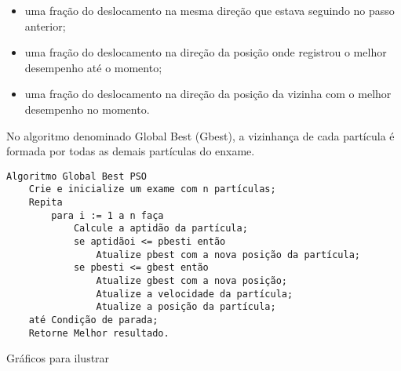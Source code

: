 \begin{itemize}
    \item uma fração do deslocamento na mesma direção que estava seguindo no passo anterior;
    \item uma fração do deslocamento na direção da posição onde registrou o melhor desempenho até o momento;
    \item uma fração do deslocamento na direção da posição da vizinha com o melhor desempenho no momento.
\end{itemize}

No algoritmo denominado Global Best (Gbest), a vizinhança de cada partícula é formada por todas as demais partículas do enxame.

\begin{verbatim}
Algoritmo Global Best PSO
    Crie e inicialize um exame com n partículas;
    Repita
        para i := 1 a n faça
            Calcule a aptidão da partícula;
            se aptidãoi <= pbesti então
                Atualize pbest com a nova posição da partícula;
            se pbesti <= gbest então
                Atualize gbest com a nova posição;
                Atualize a velocidade da partícula;
                Atualize a posição da partícula;
    até Condição de parada;
    Retorne Melhor resultado.
\end{verbatim}

Gráficos para ilustrar